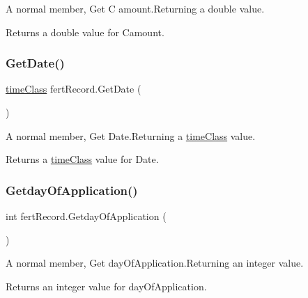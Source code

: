 A normal member, Get C amount.\+Returning a double value. 

\begin{DoxyReturn}{Returns}
a double value for Camount. 
\end{DoxyReturn}
\mbox{\label{classfert_record_a1e2f4731531fa9da8db76417ad42df1c}} 
\subsubsection{\texorpdfstring{GetDate()}{GetDate()}}
{\footnotesize\ttfamily \mbox{\hyperlink{classtime_class}{time\+Class}} fert\+Record.\+Get\+Date (\begin{DoxyParamCaption}{ }\end{DoxyParamCaption})\hspace{0.3cm}{\ttfamily [inline]}}



A normal member, Get Date.\+Returning a \mbox{\hyperlink{classtime_class}{time\+Class}} value. 

\begin{DoxyReturn}{Returns}
a \mbox{\hyperlink{classtime_class}{time\+Class}} value for Date. 
\end{DoxyReturn}
\mbox{\label{classfert_record_a2fbd7cc091c52650dbd0f96619a1dcbe}} 
\subsubsection{\texorpdfstring{GetdayOfApplication()}{GetdayOfApplication()}}
{\footnotesize\ttfamily int fert\+Record.\+Getday\+Of\+Application (\begin{DoxyParamCaption}{ }\end{DoxyParamCaption})\hspace{0.3cm}{\ttfamily [inline]}}



A normal member, Get day\+Of\+Application.\+Returning an integer value. 

\begin{DoxyReturn}{Returns}
an integer value for day\+Of\+Application. 
\end{DoxyReturn}
\mbox{\label{classfert_record_ab027ab1cd0e3579155e2457a1ba14e85}} 
